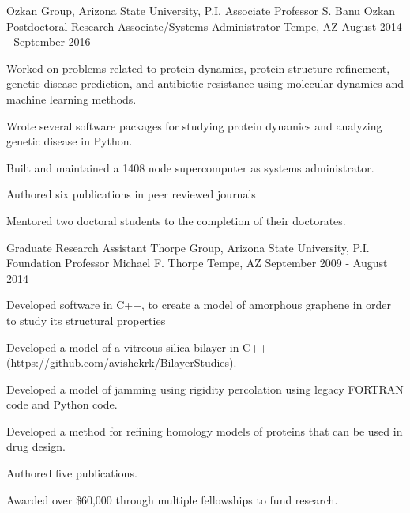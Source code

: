 \begin{cventries}
  \cventry
    {Ozkan Group, Arizona State University, P.I. Associate Professor S. Banu Ozkan} %
    {Postdoctoral Research Associate/Systems Administrator} %
    {Tempe, AZ} %
    {August 2014 - September 2016} %
    {
      \begin{cvitems} %
      \setlength\itemsep{.5em}
        \item {Worked on problems related to protein dynamics, protein structure refinement, genetic disease prediction, and antibiotic resistance using molecular dynamics and machine learning methods.}
        \item {Wrote several software packages for studying protein dynamics and analyzing genetic disease in Python.}
        \item {Built and maintained a 1408 node supercomputer as systems administrator.}
        \item {Authored six publications in peer reviewed journals}
        \item {Mentored two doctoral students to the completion of their doctorates.}
      \end{cvitems}
    }

  \cventry
    {Graduate Research Assistant} %
    {Thorpe Group, Arizona State University, P.I. Foundation Professor Michael F. Thorpe} %
    {Tempe, AZ} %
    {September 2009 - August 2014} %
    {
      \begin{cvitems} %
      \setlength\itemsep{.5em}
        \item {Developed software in C++, to create a model of amorphous graphene in order to study its structural properties}
        \item {Developed a model of a vitreous silica bilayer in C++ (https://github.com/avishekrk/BilayerStudies).}
        \item {Developed a model of jamming using rigidity percolation using legacy FORTRAN code and Python code.}
        \item {Developed a method for refining homology models of proteins that can be used in drug design.}
        \item {Authored five publications.}
        \item {Awarded over \$60,000 through multiple fellowships to fund research.}
      \end{cvitems}
    }


\end{cventries}
